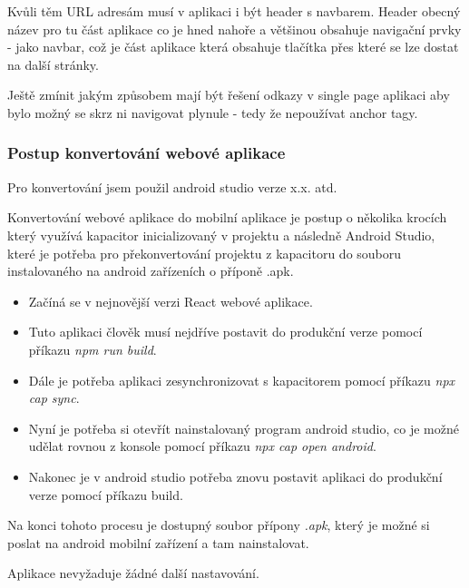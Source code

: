 Kvůli těm URL adresám musí v aplikaci i být header s navbarem. Header obecný název pro tu část aplikace co je hned nahoře a většinou obsahuje navigační prvky - jako navbar, což je část aplikace která obsahuje tlačítka přes které se lze dostat na další stránky.

Ještě zmínit jakým způsobem mají být řešení odkazy v single page aplikaci aby bylo možný se skrz ni navigovat plynule - tedy že nepoužívat anchor tagy.


\subsubsection{Postup konvertování webové aplikace}

Pro konvertování jsem použil android studio verze x.x. atd.

Konvertování webové aplikace do mobilní aplikace je postup o několika krocích který využívá kapacitor inicializovaný v projektu a následně Android Studio, které je potřeba pro překonvertování projektu z kapacitoru do souboru instalovaného na android zařízeních o příponě .apk.

\begin{itemize}
    \item Začíná se v nejnovější verzi React webové aplikace.
    \item Tuto aplikaci člověk musí nejdříve postavit do produkční verze pomocí příkazu \textit{npm run build}.
    \item Dále je potřeba aplikaci zesynchronizovat s kapacitorem pomocí příkazu \textit{npx cap sync}.
    \item Nyní je potřeba si otevřít nainstalovaný program android studio, co je možné udělat rovnou z konsole pomocí příkazu \textit{npx cap open android}.
    \item Nakonec je v android studio potřeba znovu postavit aplikaci do produkční verze pomocí příkazu build.
\end{itemize}

Na konci tohoto procesu je dostupný soubor přípony \textit{.apk}, který je možné si poslat na android mobilní zařízení a tam nainstalovat.

Aplikace nevyžaduje žádné další nastavování.

